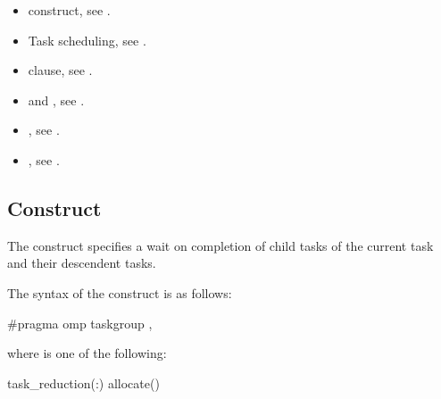 \crossreferences
\begin{itemize}
\item {} construct, see .

\item Task scheduling, see
.

\item {} clause, see .

\item {} and , see
.

\item {}, see
.

\item {}, see
.

\end{itemize}







\subsection{ Construct}
\label{subsec:taskgroup Construct}
\summary
The  construct specifies a wait on completion of child tasks of the current
task and their descendent tasks.

\syntax
\begin{ccppspecific}
The syntax of the  construct is as follows:

\begin{ompcPragma}
#pragma omp taskgroup \plc{[clause[[},\plc{] clause] ...]} 
\end{ompcPragma}

where  is one of the following:

\begin{indentedcodelist}
task_reduction(:)
allocate(\plc{[allocator: ]})
\end{indentedcodelist}
\end{ccppspecific}

